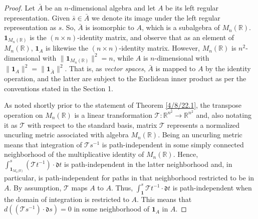 \documentclass{amsart}
\numberwithin{equation}{section}
\theoremstyle{definition}
\numberwithin{theorem}{section}
\begin{document}
\begin{proof} 
Let $\bar{A}$ be an $n$-dimensional algebra and let $A$ be its left regular representation.  Given $\bar{s}\in\bar{A}$ we denote its image under the left regular representation as $s$.
 So, $\bar{A}$ is isomorphic to $A$, which is a subalgebra of $ M_n(\mathbb{R})$.   $\mathbf{1}_{M_n(\mathbb{R})}$ is the $(n\times n)$-identity matrix, and observe that as an element of $ M_n(\mathbb{R})$, $\mathbf{1}_A$ is likewise the $(n\times n)$-identity matrix.  However, $ M_n(\mathbb{R})$ is $n^2$-dimensional with $\|\mathbf{1}_{M_n(\mathbb{R})}\|^2 = n$, while $A$ is $n$-dimensional with $\|\mathbf{1}_A\|^2 = \|\mathbf{1}_{\bar{A}}\|^2$.  That is, as {\it vector spaces}, $\bar{A}$ is mapped to  $A$ by the identity operation, and the latter are subject to the Euclidean inner product as per the conventions stated in the Section 1.   

As noted shortly prior to the statement of Theorem \ref{4/8/22.1}, the transpose operation on $ M_n(\mathbb{R})$ is a linear transformation $\mathcal{\mathcal{T}}:\mathbb{R}^{n^2}\rightarrow \mathbb{R}^{n^2}$ and, also notating it as $\mathcal{\mathcal{T}}$ with respect to the standard basis, matrix $\mathcal{\mathcal{T}}$ represents a normalized uncurling metric associated with algebra  $ M_n(\mathbb{R})$.  Being an uncurling metric means that integration of $\mathcal{\mathcal{T}}s^{-1}$ is path-independent in some simply connected neighborhood of the multiplicative identity of $ M_n(\mathbb{R})$.  
 Hence, $\int_{\mathbf{1}_{M_n({\mathbb{R})}}}^s (\mathcal{\mathcal{T}}t^{-1})\cdot \mathfrak{d}t$ is path-independent in the latter neighborhood and, in particular, is path-independent for paths in that neighborhood restricted to be in $A$.  By assumption, $\mathcal{\mathcal{T}}$ maps $A$ to $A$. 
 Thus, $\int_\mathbf{1}^s \mathcal{\mathcal{T}}t^{-1}\cdot \mathfrak{d}t$ is path-independent when the domain of integration is restricted to $A$.  This means that 
  $d((\mathcal{\mathcal{T}}s^{-1})\cdot \mathfrak{d}s) = 0$ in some neighborhood of $\mathbf{1}_A$ in $A$.
  

\end{proof}
\end{document}
